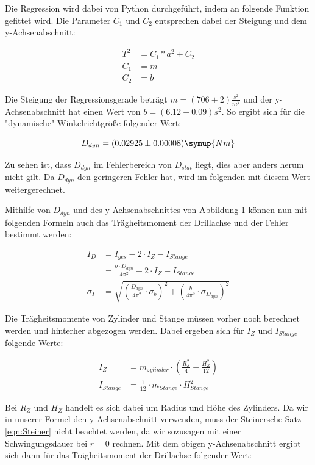 Die Regression wird dabei von Python durchgeführt, indem an folgende Funktion gefittet wird.
Die Parameter $C_1$ und $C_2$ entsprechen dabei der Steigung und dem y-Achsenabschnitt:

\begin{align}
  T^2 &= C_1 * a^2 + C_2 \\
  C_1 &= m \\
  C_2 &= b
\end{align}

Die Steigung der Regressionsgerade beträgt $m = (706 \pm 2) \frac{s^2}{m^2}$ und
der y-Achsenabschnitt hat einen Wert von $b = (6.12 \pm 0.09) s^2$. So ergibt sich für
die "dynamische" Winkelrichtgröße folgender Wert:

\begin{equation}
  D_{dyn} = (0.02925 \pm 0.00008) \symup{Nm}
\end{equation}

Zu sehen ist, dass $D_{dyn}$ im Fehlerbereich von $D_{stat}$ liegt, dies aber anders herum nicht
gilt. Da $D_{dyn}$ den geringeren Fehler hat, wird im folgenden mit diesem Wert weitergerechnet.

Mithilfe von $D_{dyn}$ und des y-Achsenabschnittes von Abbildung 1 können nun mit folgenden Formeln
auch das Trägheitsmoment der Drillachse und der Fehler bestimmt werden:

\begin{align}
  I_D        &= I_{ges} - 2 \cdot I_{Z} - I_{Stange}\\
             &= \frac{b \cdot D_{dyn}}{4 \pi^2} - 2 \cdot I_{Z} - I_{Stange}\\
  \sigma_I   &= \sqrt{ \left( \frac{D_{dyn}}{4\pi^2} \cdot \sigma_b \right) ^2 + \left( \frac{b}{4\pi^2} \cdot \sigma_{D_{dyn}} \right) ^2}
\end{align}

Die Trägheitsmomente von Zylinder und Stange müssen vorher noch berechnet werden und hinterher abgezogen werden.
Dabei ergeben sich für $I_{Z}$ und $I_{Stange}$ folgende Werte:

\begin{align}
  I_Z        &= m_{zylinder} \cdot \left( \frac{R_Z^2}{4} + \frac{H_Z^2}{12} \right)\\
  I_{Stange} &= \frac{1}{12} \cdot m_{Stange} \cdot H_{Stange}^2
\end{align}

Bei $R_Z$ und $H_Z$ handelt es sich dabei um Radius und Höhe des Zylinders. Da wir in unserer Formel
den y-Achsenabschnitt verwenden, muss der Steinersche Satz \eqref{eqn:Steiner} nicht beachtet werden, da wir sozusagen
mit einer Schwingungsdauer bei $r=0$ rechnen.
Mit dem obigen y-Achsenabschnitt ergibt sich dann für das Trägheitsmoment der Drillachse folgender Wert:

